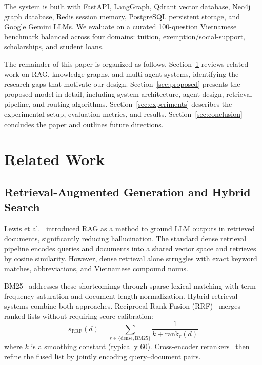 \documentclass[runningheads]{llncs}
\begin{document}
The system is built with FastAPI, LangGraph, Qdrant vector database, Neo4j graph database, Redis session memory, PostgreSQL persistent storage, and Google Gemini LLMs. We evaluate on a curated 100-question Vietnamese benchmark balanced across four domains: tuition, exemption/social-support, scholarships, and student loans.

The remainder of this paper is organized as follows. Section~\ref{sec:related} reviews related work on RAG, knowledge graphs, and multi-agent systems, identifying the research gaps that motivate our design. Section~\ref{sec:proposed} presents the proposed model in detail, including system architecture, agent design, retrieval pipeline, and routing algorithms. Section~\ref{sec:experiments} describes the experimental setup, evaluation metrics, and results. Section~\ref{sec:conclusion} concludes the paper and outlines future directions.


\section{Related Work}
\label{sec:related}

\subsection{Retrieval-Augmented Generation and Hybrid Search}
\label{sec:rag_hybrid}

Lewis et al.~\cite{lewis2020rag} introduced RAG as a method to ground LLM outputs in retrieved documents, significantly reducing hallucination. The standard dense retrieval pipeline encodes queries and documents into a shared vector space and retrieves by cosine similarity. However, dense retrieval alone struggles with exact keyword matches, abbreviations, and Vietnamese compound nouns.

BM25~\cite{robertson2009bm25} addresses these shortcomings through sparse lexical matching with term-frequency saturation and document-length normalization. Hybrid retrieval systems combine both approaches. Reciprocal Rank Fusion (RRF)~\cite{cormack2009rrf} merges ranked lists without requiring score calibration:
\begin{equation}
    s_{\text{RRF}}(d) = \sum_{r \in \{\text{dense}, \text{BM25}\}} \frac{1}{k + \text{rank}_r(d)}
    \label{eq:rrf}
\end{equation}
where $k$ is a smoothing constant (typically 60). Cross-encoder rerankers~\cite{nogueira2020reranker} then refine the fused list by jointly encoding query--document pairs.
\end{document}
